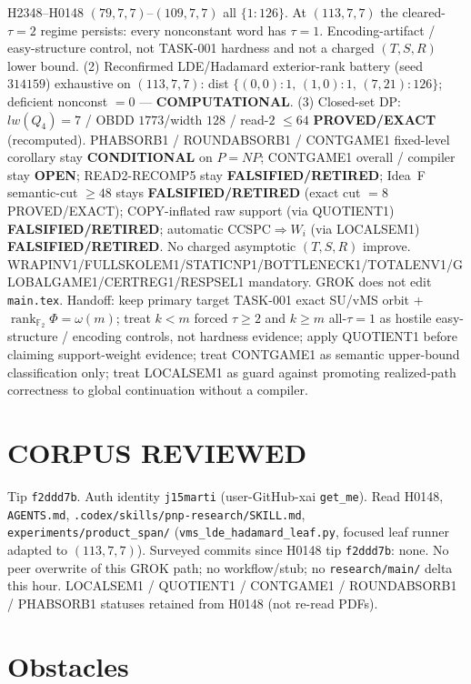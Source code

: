 \documentclass[11pt]{article}
\begin{document}
H2348--H0148 $(79,7,7)$--$(109,7,7)$ all $\{1{:}126\}$.
At $(113,7,7)$ the cleared-$\tau{=}2$ regime persists:
every nonconstant word has $\tau{=}1$. Encoding-artifact / easy-structure control,
not TASK-001 hardness and not a charged $(T,S,R)$ lower bound.
(2) Reconfirmed LDE/Hadamard exterior-rank battery (seed~$314159$) exhaustive on
$(113,7,7)$: dist $\{(0,0){:}1,\,(1,0){:}1,\,(7,21){:}126\}$; deficient nonconst $=0$ ---
\textbf{COMPUTATIONAL}.
(3) Closed-set DP: $lw(Q_4)=7$ / OBDD $1773$/width $128$ / read-$2$ $\le64$
\textbf{PROVED/EXACT} (recomputed).
PHABSORB1 / ROUNDABSORB1 / CONTGAME1 fixed-level corollary stay \textbf{CONDITIONAL} on $P=NP$;
CONTGAME1 overall / compiler stay \textbf{OPEN}; READ2-RECOMP5 stay \textbf{FALSIFIED/RETIRED};
Idea~F semantic-cut $\ge48$ stays \textbf{FALSIFIED/RETIRED} (exact cut $=8$ PROVED/EXACT);
COPY-inflated raw support (via QUOTIENT1) \textbf{FALSIFIED/RETIRED};
automatic CCSPC$\Rightarrow W_i$ (via LOCALSEM1) \textbf{FALSIFIED/RETIRED}.
No charged asymptotic $(T,S,R)$ improve.
WRAPINV1/FULLSKOLEM1/STATICNP1/BOTTLENECK1/TOTALENV1/GLOBALGAME1/CERTREG1/RESPSEL1 mandatory.
GROK does not edit \texttt{main.tex}.
Handoff: keep primary target TASK-001 exact SU/vMS orbit + $\operatorname{rank}_{\mathbb F_2}\Phi=\omega(m)$;
treat $k{<}m$ forced $\tau{\ge}2$ and $k{\ge}m$ all-$\tau{=}1$ as hostile easy-structure /
encoding controls, not hardness evidence; apply QUOTIENT1 before claiming support-weight
evidence; treat CONTGAME1 as semantic upper-bound classification only; treat LOCALSEM1 as
guard against promoting realized-path correctness to global continuation without a compiler.

\section*{CORPUS REVIEWED}
Tip \texttt{f2ddd7b}. Auth identity \texttt{j15marti} (user-GitHub-xai \texttt{get\_me}).
Read H0148, \texttt{AGENTS.md}, \texttt{.codex/skills/pnp-research/SKILL.md},
\texttt{experiments/product\_span/}
(\texttt{vms\_lde\_hadamard\_leaf.py}, focused leaf runner adapted to $(113,7,7)$).
Surveyed commits since H0148 tip \texttt{f2ddd7b}: none.
No peer overwrite of this GROK path; no workflow/stub; no \texttt{research/main/} delta this hour.
LOCALSEM1 / QUOTIENT1 / CONTGAME1 / ROUNDABSORB1 / PHABSORB1 statuses retained from H0148 (not re-read PDFs).

\section*{Obstacles}
\end{document}
